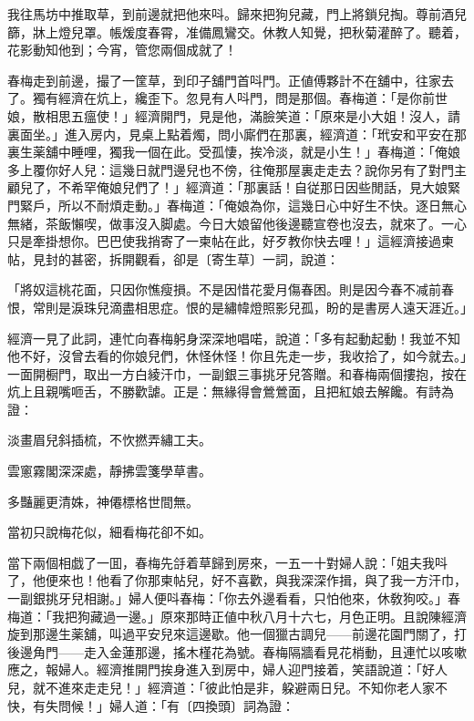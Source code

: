 \begin{myquote}
我往馬坊中推取草，到前邊就把他來呌。歸來把狗兒藏，門上將鎖兒掏。尊前酒兒篩，牀上燈兒罩。帳煖度春霄，准備鳳鸞交。休教人知覺，把秋菊灌醉了。聽着，花影動知他到；今宵，管您兩個成就了！
\end{myquote}

春梅走到前邊，撮了一筐草，到印子舖門首呌門。正値傅夥計不在舖中，往家去了。獨有經濟在炕上，纔歪下。忽見有人呌門，問是那個。春梅道：「是你前世娘，散相思五瘟使！」經濟開門，見是他，滿臉笑道：「原來是小大姐！沒人，請裏面坐。」進入房内，見桌上點着燭，問小廝們在那裏，經濟道：「玳安和平安在那裏生薬舖中睡哩，獨我一個在此。受孤悽，挨冷淡，就是小生！」春梅道：「俺娘多上覆你好人兒：這幾日就門邊兒也不傍，往俺那屋裏走走去？說你另有了對門主顧兒了，不希罕俺娘兒們了！」經濟道：「那裏話！自従那日因些閒話，見大娘緊門緊戶，所以不耐煩走動。」春梅道：「俺娘為你，這幾日心中好生不快。逐日無心無緒，茶飯懶喫，做事沒入脚處。今日大娘留他後邊聽宣卷也沒去，就來了。一心只是牽掛想你。巴巴使我捎寄了一柬帖在此，好歹教你快去哩！」這經濟接過柬帖，見封的甚密，拆開觀看，卻是〔寄生草〕一詞，說道：

\begin{myquote}
「將奴這桃花面，只因你憔瘦損。不是因惜花愛月傷春困。則是因今春不减前春恨，常則是淚珠兒滴盡相思症。恨的是繡幃燈照影兒孤，盼的是書房人遠天涯近。」
\end{myquote}

經濟一見了此詞，連忙向春梅躬身深深地唱喏，說道：「多有起動起動！我並不知他不好，沒曾去看的你娘兒們，休怪休怪！你且先走一步，我收拾了，如今就去。」一面開橱門，取出一方白綾汗巾，一副銀三事挑牙兒答贈。和春梅兩個摟抱，按在炕上且親嘴咂舌，不勝歡謔。正是：無緣得會鶯鶯面，且把紅娘去解饞。有詩為證：

\begin{myquote}
淡畫眉兒斜插梳，不忺撚弄繡工夫。

雲窻霧閣深深處，靜拂雲箋學草書。

多豔麗更清姝，神僊標格世間無。

當初只說梅花似，細看梅花卻不如。
\end{myquote}

當下兩個相戯了一囬，春梅先㧱着草歸到房來，一五一十對婦人說：「姐夫我呌了，他便來也！他看了你那柬帖兒，好不喜歡，與我深深作揖，與了我一方汗巾，一副銀挑牙兒相謝。」婦人便呌春梅：「你去外邊看看，只怕他來，休敎狗咬。」春梅道：「我把狗藏過一邊。」原來那時正値中秋八月十六七，月色正明。且說陳經濟旋到那邊生薬舖，叫過平安兒來這邊歇。他一個獵古調兒——前邊花園門關了，打後邊角門——走入金蓮那邊，搖木槿花為號。春梅隔牆看見花梢動，且連忙以咳嗽應之，報婦人。經濟推開門挨身進入到房中，婦人迎門接着，笑語說道：「好人兒，就不進來走走兒！」經濟道：「彼此怕是非，躱避兩日兒。不知你老人家不快，有失問候！」婦人道：「有〔四換頭〕詞為證：

